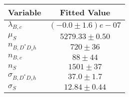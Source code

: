 \begin{tabular}[t]{lc}
\hline
Variable &Fitted Value\\
\hline\hline
$\lambda_{B,c}$&$(-0.0\pm1.6)e-07$\\
\hline
$\mu_S$&$5279.33\pm0.50$\\
\hline
$n_{B, D^* D_s h}$&$720\pm36$\\
\hline
$n_{B,c}$&$88\pm44$\\
\hline
$n_S$&$1501\pm37$\\
\hline
$\sigma_{B, D^* D_s h}$&$37.0\pm1.7$\\
\hline
$\sigma_S$&$12.84\pm0.44$\\
\hline
\end{tabular}